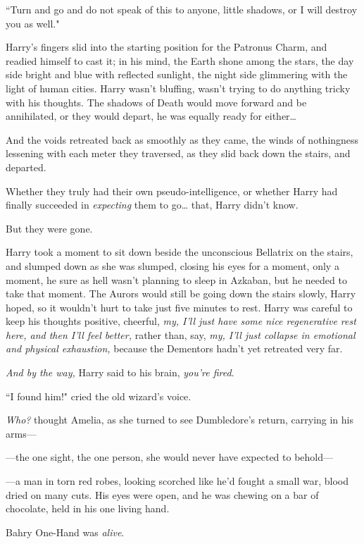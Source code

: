 ``Turn and go and do not speak of this to anyone, little shadows, or I will destroy you as well."

Harry's fingers slid into the starting position for the Patronus Charm, and readied himself to cast it; in his mind, the Earth shone among the stars, the day side bright and blue with reflected sunlight, the night side glimmering with the light of human cities. Harry wasn't bluffing, wasn't trying to do anything tricky with his thoughts. The shadows of Death would move forward and be annihilated, or they would depart, he was equally ready for either{\ldots}

And the voids retreated back as smoothly as they came, the winds of nothingness lessening with each meter they traversed, as they slid back down the stairs, and departed.

Whether they truly had their own pseudo-intelligence, or whether Harry had finally succeeded in \emph{expecting} them to go{\ldots} that, Harry didn't know.

But they were gone.

Harry took a moment to sit down beside the unconscious Bellatrix on the stairs, and slumped down as she was slumped, closing his eyes for a moment, only a moment, he sure as hell wasn't planning to sleep in Azkaban, but he needed to take that moment. The Aurors would still be going down the stairs slowly, Harry hoped, so it wouldn't hurt to take just five minutes to rest. Harry was careful to keep his thoughts positive, cheerful, \emph{my, I'll just have some nice regenerative rest here, and then I'll feel better,} rather than, say, \emph{my, I'll just collapse in emotional and physical exhaustion,} because the Dementors hadn't yet retreated very far.

\emph{And by the way,} Harry said to his brain, \emph{you're fired}.

\later

``I found him!" cried the old wizard's voice.

\emph{Who?} thought Amelia, as she turned to see Dumbledore's return, carrying in his arms—

—the one sight, the one person, she would never have expected to behold—

—a man in torn red robes, looking scorched like he'd fought a small war, blood dried on many cuts. His eyes were open, and he was chewing on a bar of chocolate, held in his one living hand.

Bahry One-Hand was \emph{alive}.

